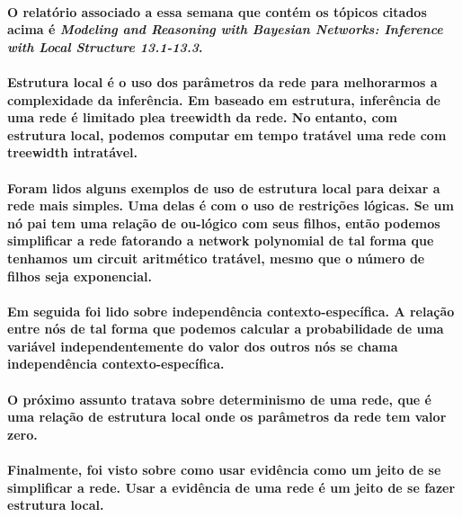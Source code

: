 \documentclass[a4paper,10pt]{article}
\theoremstyle{plain}
\begin{document}
\paragraph{
  O relatório associado a essa semana que contém os tópicos citados acima é \textit{Modeling and
  Reasoning with Bayesian Networks: Inference with Local Structure 13.1-13.3}\cite{report-8}.
}

\paragraph{
  Estrutura local é o uso dos parâmetros da rede para melhorarmos a complexidade da inferência.
  Em baseado em estrutura, inferência de uma rede é limitado plea treewidth da rede. No entanto,
  com estrutura local, podemos computar em tempo tratável uma rede com treewidth intratável.
}

\paragraph{
  Foram lidos alguns exemplos de uso de estrutura local para deixar a rede mais simples. Uma delas
  é com o uso de restrições lógicas. Se um nó pai tem uma relação de ou-lógico com seus filhos,
  então podemos simplificar a rede fatorando a network polynomial de tal forma que tenhamos um
  circuit aritmético tratável, mesmo que o número de filhos seja exponencial.
}

\paragraph{
  Em seguida foi lido sobre independência contexto-específica. A relação entre nós de tal forma que
  podemos calcular a probabilidade de uma variável independentemente do valor dos outros nós se
  chama independência contexto-específica.
}

\paragraph{
  O próximo assunto tratava sobre determinismo de uma rede, que é uma relação de estrutura local
  onde os parâmetros da rede tem valor zero.
}

\paragraph{
  Finalmente, foi visto sobre como usar evidência como um jeito de se simplificar a rede. Usar a
  evidência de uma rede é um jeito de se fazer estrutura local.
}
\end{document}
